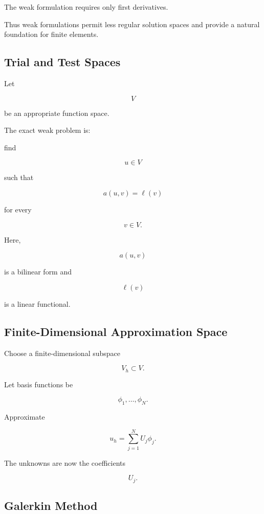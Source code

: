 The weak formulation requires only first derivatives.

Thus weak formulations permit less regular solution spaces and provide a
natural foundation for finite elements.

\subsection{Trial and Test Spaces}
\label{subsec:trial-test-spaces}

Let

\[
V
\]

be an appropriate function space.

The exact weak problem is:

find

\[
\boxed{
u\in V
}
\]

such that

\[
\boxed{
a(u,v)
=
\ell(v)
}
\]

for every

\[
\boxed{
v\in V.
}
\]

Here,

\[
a(u,v)
\]

is a bilinear form and

\[
\ell(v)
\]

is a linear functional.

\subsection{Finite-Dimensional Approximation Space}
\label{subsec:finite-element-space}

Choose a finite-dimensional subspace

\[
\boxed{
V_h
\subset V.
}
\]

Let basis functions be

\[
\boxed{
\phi_1,\ldots,\phi_N.
}
\]

Approximate

\[
\boxed{
u_h
=
\sum_{j=1}^{N}
U_j\phi_j.
}
\]

The unknowns are now the coefficients

\[
U_j.
\]

\subsection{Galerkin Method}
\label{subsec:galerkin-method}


